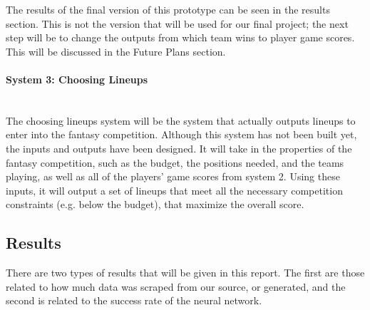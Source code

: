 The results of the final version of this prototype can be seen in the results section. This is not the version that will be used for our final project; the next step will be to change the outputs from which team wins to player game scores. This will be discussed in the Future Plans section.

\paragraph{System 3: Choosing Lineups}\mbox{}\\
The choosing lineups system will be the system that actually outputs lineups to enter into the fantasy competition. Although this system has not been built yet, the inputs and outputs have been designed. It will take in the properties of the fantasy competition, such as the budget, the positions needed, and the teams playing, as well as all of the players' game scores from system 2. Using these inputs, it will output a set of lineups that meet all the necessary competition constraints (e.g. below the budget), that maximize the overall score.

\subsection{Results}
There are two types of results that will be given in this report. The first are those related to how much data was scraped from our source, or generated, and the second is related to the success rate of the neural network.

